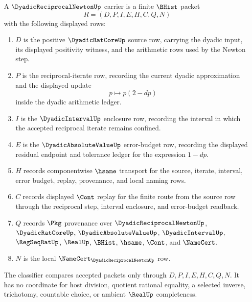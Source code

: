 \begin{definition}
\label{def:dyadic-reciprocal-newton-carrier}
A $\DyadicReciprocalNewtonUp$ carrier is a finite $\BHist$ packet
$$
R=(D,P,I,E,H,C,Q,N)
$$
with the following displayed rows:
\begin{enumerate}
\item $D$ is the positive $\DyadicRatCoreUp$ source row, carrying the dyadic input, its displayed positivity witness, and the arithmetic rows used by the Newton step.
\item $P$ is the reciprocal-iterate row, recording the current dyadic approximation and the displayed update
$$
p \longmapsto p(2-dp)
$$
inside the dyadic arithmetic ledger.
\item $I$ is the $\DyadicIntervalUp$ enclosure row, recording the interval in which the accepted reciprocal iterate remains confined.
\item $E$ is the $\DyadicAbsoluteValueUp$ error-budget row, recording the displayed residual endpoint and tolerance ledger for the expression $1-dp$.
\item $H$ records componentwise $\hsame$ transport for the source, iterate, interval, error budget, replay, provenance, and local naming rows.
\item $C$ records displayed $\Cont$ replay for the finite route from the source row through the reciprocal step, interval enclosure, and error-budget readback.
\item $Q$ records $\Pkg$ provenance over $\DyadicReciprocalNewtonUp$, $\DyadicRatCoreUp$, $\DyadicAbsoluteValueUp$, $\DyadicIntervalUp$, $\RegSeqRatUp$, $\RealUp$, $\BHist$, $\hsame$, $\Cont$, and $\NameCert$.
\item $N$ is the local $\NameCert_{\DyadicReciprocalNewtonUp}$ row.
\end{enumerate}
The classifier compares accepted packets only through $D,P,I,E,H,C,Q,N$. It has no coordinate for host division, quotient rational equality, a selected inverse, trichotomy, countable choice, or ambient $\RealUp$ completeness.
\end{definition}

